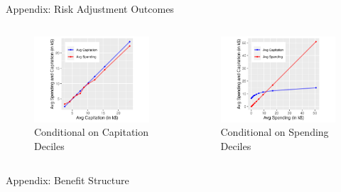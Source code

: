 \documentclass[professionalfonts, aspectratio=169]{beamer}
\begin{document}
\begin{frame}{Appendix: Risk Adjustment Outcomes}
  \begin{columns}
    \begin{column}{0.5\textwidth}
      \begin{figure}
        \centering
        \includegraphics[width=1\textwidth]{figures/images/avg_spending_vs_capitation_by_capitation_deciles.png}
        \caption{Conditional on Capitation Deciles}
      \end{figure}
    \end{column}
    \begin{column}{0.5\textwidth}
      \begin{figure}
        \centering
        \includegraphics[width=1\textwidth]{figures/images/avg_spending_vs_capitation_by_spending_deciles.png}
        \caption{Conditional on Spending Deciles}
      \end{figure}
    \end{column}
    
  \end{columns}
\end{frame}

\begin{frame}{Appendix: Benefit Structure}
  \begin{figure}
    \begin{figure}
      \centering
      \resizebox{0.8\textwidth}{!}{}
    \end{figure}
  \end{figure}
\end{frame}
\end{document}
